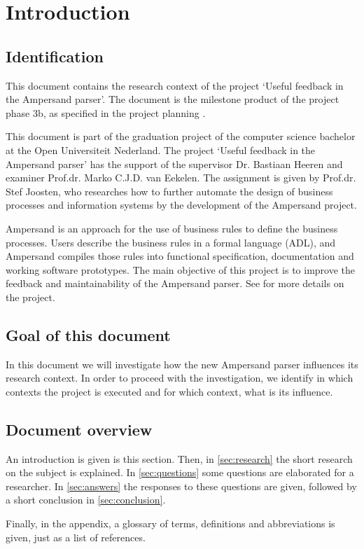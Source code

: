
\section{Introduction}
\subsection{Identification}
This document contains the research context of the project `Useful feedback in the Ampersand parser'.
The document is the milestone product of the project phase 3b, as specified in the project planning .

This document is part of the graduation project of the computer science bachelor at the Open Universiteit Nederland.
The project `Useful feedback in the Ampersand parser' has the support of the supervisor Dr. Bastiaan Heeren and examiner Prof.dr. Marko C.J.D. van Eekelen.
The assignment is given by Prof.dr. Stef Joosten, who researches how to further automate the design of business processes and information systems by the development of the Ampersand project.

Ampersand is an approach for the use of business rules to define the business processes.
Users describe the business rules in a formal language (ADL), and Ampersand compiles those rules into functional specification, documentation and working software
prototypes.
The main objective of this project is to improve the feedback and maintainability of the Ampersand parser.
See  for more details on the project.

\subsection{Goal of this document}
In this document we will investigate how the new Ampersand parser influences its research context.
In order to proceed with the investigation, we identify in which contexts the project is executed and for which context, what is its influence.

\subsection{Document overview}
An introduction is given is this section.
Then, in \autoref{sec:research} the short research on the subject is explained.
In \autoref{sec:questions} some questions are elaborated for a researcher.
In \autoref{sec:answers} the responses to these questions are given, followed by a short conclusion in \autoref{sec:conclusion}.

Finally, in the appendix, a glossary of terms, definitions and abbreviations is given, just as a list of references.
